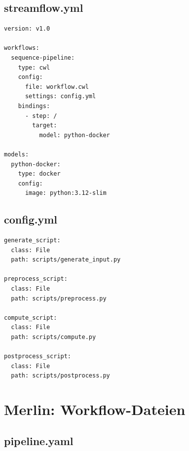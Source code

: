 \section{streamflow.yml}
\label{app:streamflow:yml}

\begin{lstlisting}[caption={streamflow.yml: Deployment-Konfiguration (StreamFlow)},
                   label={lst:app:streamflow:yml}]
version: v1.0

workflows:
  sequence-pipeline:
    type: cwl
    config:
      file: workflow.cwl
      settings: config.yml
    bindings:
      - step: /
        target:
          model: python-docker

models:
  python-docker:
    type: docker
    config:
      image: python:3.12-slim
\end{lstlisting}

\section{config.yml}
\label{app:streamflow:config}

\begin{lstlisting}[caption={config.yml: Eingabe-Konfiguration (StreamFlow)},
                   label={lst:app:streamflow:config}]
generate_script:
  class: File
  path: scripts/generate_input.py

preprocess_script:
  class: File
  path: scripts/preprocess.py

compute_script:
  class: File
  path: scripts/compute.py

postprocess_script:
  class: File
  path: scripts/postprocess.py
\end{lstlisting}

\chapter{Merlin: Workflow-Dateien}
\label{app:merlin}

\section{pipeline.yaml}
\label{app:merlin:yaml}

